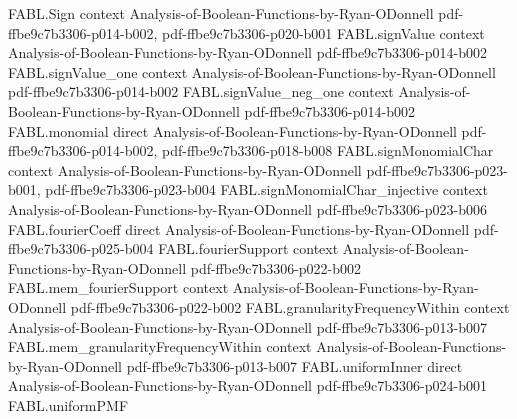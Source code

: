 \begin{theorem}
\label{FABL.FiniteFourierBasis.orthogonalComponent_productNoiseOperator}
\leanok
{}
\proofstep
  {FABL.Sign}
  {context}
  {Analysis-of-Boolean-Functions-by-Ryan-ODonnell}
  {pdf-ffbe9c7b3306-p014-b002,
    pdf-ffbe9c7b3306-p020-b001}
\proofstep
  {FABL.signValue}
  {context}
  {Analysis-of-Boolean-Functions-by-Ryan-ODonnell}
  {pdf-ffbe9c7b3306-p014-b002}
\proofstep
  {FABL.signValue_one}
  {context}
  {Analysis-of-Boolean-Functions-by-Ryan-ODonnell}
  {pdf-ffbe9c7b3306-p014-b002}
\proofstep
  {FABL.signValue_neg_one}
  {context}
  {Analysis-of-Boolean-Functions-by-Ryan-ODonnell}
  {pdf-ffbe9c7b3306-p014-b002}
\proofstep
  {FABL.monomial}
  {direct}
  {Analysis-of-Boolean-Functions-by-Ryan-ODonnell}
  {pdf-ffbe9c7b3306-p014-b002,
    pdf-ffbe9c7b3306-p018-b008}
\proofstep
  {FABL.signMonomialChar}
  {context}
  {Analysis-of-Boolean-Functions-by-Ryan-ODonnell}
  {pdf-ffbe9c7b3306-p023-b001,
    pdf-ffbe9c7b3306-p023-b004}
\proofstep
  {FABL.signMonomialChar_injective}
  {context}
  {Analysis-of-Boolean-Functions-by-Ryan-ODonnell}
  {pdf-ffbe9c7b3306-p023-b006}
\proofstep
  {FABL.fourierCoeff}
  {direct}
  {Analysis-of-Boolean-Functions-by-Ryan-ODonnell}
  {pdf-ffbe9c7b3306-p025-b004}
\proofstep
  {FABL.fourierSupport}
  {context}
  {Analysis-of-Boolean-Functions-by-Ryan-ODonnell}
  {pdf-ffbe9c7b3306-p022-b002}
\proofstep
  {FABL.mem_fourierSupport}
  {context}
  {Analysis-of-Boolean-Functions-by-Ryan-ODonnell}
  {pdf-ffbe9c7b3306-p022-b002}
\proofstep
  {FABL.granularityFrequencyWithin}
  {context}
  {Analysis-of-Boolean-Functions-by-Ryan-ODonnell}
  {pdf-ffbe9c7b3306-p013-b007}
\proofstep
  {FABL.mem_granularityFrequencyWithin}
  {context}
  {Analysis-of-Boolean-Functions-by-Ryan-ODonnell}
  {pdf-ffbe9c7b3306-p013-b007}
\proofstep
  {FABL.uniformInner}
  {direct}
  {Analysis-of-Boolean-Functions-by-Ryan-ODonnell}
  {pdf-ffbe9c7b3306-p024-b001}
\proofstep
  {FABL.uniformPMF}

\end{theorem}

